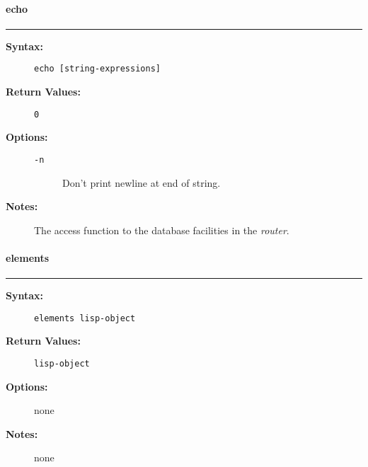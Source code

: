 \vspace {2pt}


\paragraph{echo}

\hrule
\begin{description}
\item[{\bf Syntax:}] \mbox{}

{\tt echo [string-expressions]}

\item[{\bf Return Values:}] \mbox{}

\begin{description}
\item[{\tt 0}] \mbox{}

        

\end{description}


\item[{\bf Options:}] \mbox{}

\begin{description}
\item[{\tt -n}] \mbox{}

Don't print newline at end of string.

\end{description}


\item[{\bf Notes:}] \mbox{}

The access function to the database facilities in the 
{\em router\/}.

\end{description}


\vspace {2pt}


\paragraph{elements}

\hrule
\begin{description}
\item[{\bf Syntax:}] \mbox{}

{\tt elements lisp-object}

\item[{\bf Return Values:}] \mbox{}

{\tt lisp-object}

\item[{\bf Options:}] \mbox{}

none  

\item[{\bf Notes:}] \mbox{}

none

\end{description}


